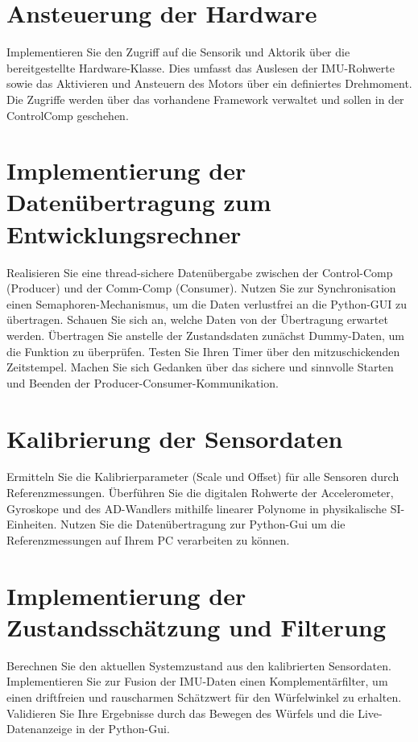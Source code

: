    \section{Ansteuerung der Hardware}
        Implementieren Sie den Zugriff auf die Sensorik und Aktorik über die bereitgestellte Hardware-Klasse. Dies umfasst das Auslesen der IMU-Rohwerte sowie das Aktivieren und Ansteuern des Motors über ein definiertes Drehmoment. Die Zugriffe werden über das vorhandene Framework verwaltet und sollen in der ControlComp geschehen. 

    \section{Implementierung der Datenübertragung zum Entwicklungsrechner}
    \label{sec:Datatransfer}
        Realisieren Sie eine thread-sichere Datenübergabe zwischen der Control-Comp (Producer) und der Comm-Comp (Consumer). Nutzen Sie zur Synchronisation einen Semaphoren-Mechanismus, um die Daten verlustfrei an die Python-GUI zu übertragen. Schauen Sie sich an, welche Daten von der Übertragung erwartet werden. Übertragen Sie anstelle der Zustandsdaten zunächst Dummy-Daten, um die Funktion zu überprüfen. Testen Sie Ihren Timer über den mitzuschickenden Zeitstempel. Machen Sie sich Gedanken über das sichere und sinnvolle Starten und Beenden der Producer-Consumer-Kommunikation. 

    \section{Kalibrierung der Sensordaten}
        Ermitteln Sie die Kalibrierparameter (Scale und Offset) für alle Sensoren durch Referenzmessungen. Überführen Sie die digitalen Rohwerte der Accelerometer, Gyroskope und des AD-Wandlers mithilfe linearer Polynome in physikalische SI-Einheiten. Nutzen Sie die Datenübertragung zur Python-Gui um die Referenzmessungen auf Ihrem PC verarbeiten zu können.

    \section{Implementierung der Zustandsschätzung und Filterung}
        Berechnen Sie den aktuellen Systemzustand aus den kalibrierten Sensordaten. Implementieren Sie zur Fusion der IMU-Daten einen Komplementärfilter, um einen driftfreien und rauscharmen Schätzwert für den Würfelwinkel zu erhalten. Validieren Sie Ihre Ergebnisse durch das Bewegen des Würfels und die Live-Datenanzeige in der Python-Gui.

